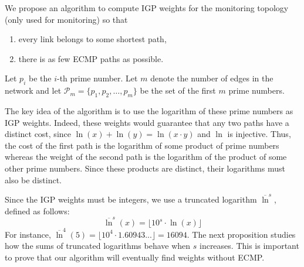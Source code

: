 We propose an algorithm to compute IGP weights for the monitoring topology (only used for monitoring) so that
\begin{enumerate}
 \item every link belongs to some shortest path,
 \item there is as few ECMP paths as possible.
\end{enumerate}

Let $p_i$ be the $i$-th prime number. Let $m$ denote the number of edges in the network and let $\mathcal{P}_m = \{ p_1, p_2, \ldots, p_m \}$ be the set of
the first $m$ prime numbers.

The key idea of the algorithm is to use the logarithm of these prime numbers as IGP weights.
Indeed, these weights would guarantee that any two paths have a distinct cost, since $\ln(x) + \ln(y) = \ln(x \cdot y)$
and $\ln$ is injective. Thus, the cost of the first path is the logarithm of some product of prime numbers whereas the weight of the second
path is the logarithm of the product of some other prime numbers. Since these products are distinct, their logarithms must
also be distinct. %

Since the IGP weights must be integers, we use a truncated logarithm $\overline{\ln}^s$, defined as follows:
$$
\overline{\ln}^s(x) = \lfloor 10^s \cdot \ln(x) \rfloor
$$
For instance, $\overline{\ln}^4(5) = \lfloor 10^4 \cdot 1.60943... \rfloor = 16094$.
The next proposition studies how the sums of truncated logarithms behave when $s$
increases. This is important to prove that our algorithm will eventually find
weights without ECMP.

